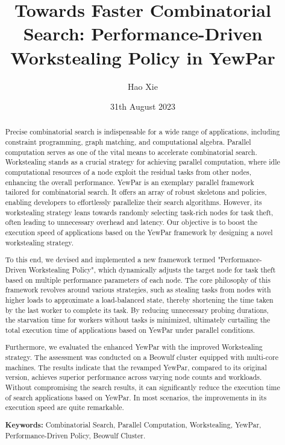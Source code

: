 \documentclass{mproj}
\begin{document}
\title{Towards Faster Combinatorial Search: Performance-Driven Workstealing Policy in YewPar}
\author{Hao Xie}
\date{31th August 2023}
\maketitle

\begin{abstract}

    Precise combinatorial search is indispensable for a wide range of applications,
    including constraint programming, graph matching, and computational algebra.
    Parallel computation serves as one of the vital means to accelerate combinatorial search.
    Workstealing stands as a crucial strategy for achieving parallel computation,
    where idle computational resources of a node exploit the residual tasks from other nodes,
    enhancing the overall performance.
    YewPar is an exemplary parallel framework tailored for combinatorial search.
    It offers an array of robust skeletons and policies, enabling developers to effortlessly parallelize their search algorithms.
    However, its workstealing strategy leans towards randomly selecting task-rich nodes for task theft,
    often leading to unnecessary overhead and latency.
    Our objective is to boost the execution speed of applications based on the YewPar framework by designing a novel workstealing strategy.

    To this end, we devised and implemented a new framework termed "Performance-Driven Workstealing Policy",
    which dynamically adjusts the target node for task theft based on multiple performance parameters of each node.
    The core philosophy of this framework revolves around various strategies,
    such as stealing tasks from nodes with higher loads to approximate a load-balanced state,
    thereby shortening the time taken by the last worker to complete its task.
    By reducing unnecessary probing durations, the starvation time for workers without tasks is minimized,
    ultimately curtailing the total execution time of applications based on YewPar under parallel conditions.

    Furthermore, we evaluated the enhanced YewPar with the improved Workstealing strategy.
    The assessment was conducted on a Beowulf cluster equipped with multi-core machines.
    The results indicate that the revamped YewPar, compared to its original version,
    achieves superior performance across varying node counts and workloads.
    Without compromising the search results, it can significantly reduce the execution time of search applications based on YewPar.
    In most scenarios, the improvements in its execution speed are quite remarkable.

    \textbf{Keywords:} Combinatorial Search, Parallel Computation, Workstealing, YewPar, Performance-Driven Policy, Beowulf Cluster.

\end{abstract}
\end{document}
